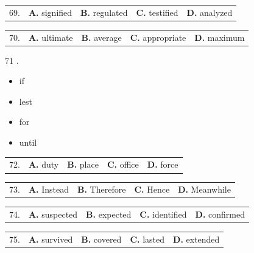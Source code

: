 \documentclass[UTF8,11pt]{ctexart}
\begin{document}
\noindent\begin{tabularx}{\linewidth}{@{}lXXXX@{}}69. & \textbf{A.} signified & \textbf{B.} regulated & \textbf{C.} testified & \textbf{D.} analyzed\\\end{tabularx}\par

\noindent\begin{tabularx}{\linewidth}{@{}lXXXX@{}}70. & \textbf{A.} ultimate & \textbf{B.} average & \textbf{C.} appropriate & \textbf{D.} maximum\\\end{tabularx}\par

71 .


\begin{itemize}[leftmargin=2em,itemsep=.2em,topsep=.4em]\item[A.] if
\item[B.] lest
\item[C.] for
\item[D.] until
\end{itemize}

\noindent\begin{tabularx}{\linewidth}{@{}lXXXX@{}}72. & \textbf{A.} duty & \textbf{B.} place & \textbf{C.} office & \textbf{D.} force\\\end{tabularx}\par

\noindent\begin{tabularx}{\linewidth}{@{}lXXXX@{}}73. & \textbf{A.} Instead & \textbf{B.} Therefore & \textbf{C.} Hence & \textbf{D.} Meanwhile\\\end{tabularx}\par

\noindent\begin{tabularx}{\linewidth}{@{}lXXXX@{}}74. & \textbf{A.} suspected & \textbf{B.} expected & \textbf{C.} identified & \textbf{D.} confirmed\\\end{tabularx}\par

\noindent\begin{tabularx}{\linewidth}{@{}lXXXX@{}}75. & \textbf{A.} survived & \textbf{B.} covered & \textbf{C.} lasted & \textbf{D.} extended\\\end{tabularx}\par
\end{document}
